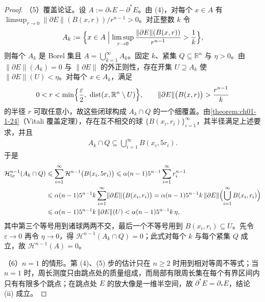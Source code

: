 \documentclass[../../main.tex]{subfiles}%
\begin{document}
\begin{proof}
（5）覆盖论证。设 $A:=\partial_*E-\partial^*E$。由 (4)，对每个 $x\in A$ 有 $\limsup_{r\to0}\lVert\partial E\rVert(B(x,r))/r^{n-1}>0$。对正整数 $k$ 令
\begin{align*}
A_k:=\Bigl\{x\in A\Bigm|\limsup_{r\to0}\frac{\lVert\partial E\rVert(B(x,r))}{r^{n-1}}>\frac1k\Bigr\},
\end{align*}
则每个 $A_k$ 是 Borel 集且 $A=\bigcup_{k=1}^{\infty}A_k$。固定 $k$、紧集 $Q\subseteq\mathbb{R}^n$ 与 $\eta>0$。由 $\lVert\partial E\rVert(A_k)=0$ 与 $\lVert\partial E\rVert$ 的外正则性，存在开集 $U\supseteq A_k$ 使 $\lVert\partial E\rVert(U)<\eta$。对每个 $x\in A_k$，满足
\begin{align*}
0<r<\min\Bigl\{\frac{\varepsilon}{2},\ \operatorname{dist}(x,\mathbb{R}^n\setminus U)\Bigr\},\qquad \lVert\partial E\rVert\bigl(B(x,r)\bigr)>\frac{r^{n-1}}{k}
\end{align*}
的半径 $r$ 可取任意小，故这些闭球构成 $A_k\cap Q$ 的一个细覆盖。由\cref{theorem:ch01-1-24}（Vitali 覆盖定理），存在互不相交的球 $\{B(x_i,r_i)\}_{i=1}^{\infty}$，其半径满足上述要求，并且%
\begin{align*}
A_k\cap Q\subseteq\bigcup_{i=1}^{\infty}B(x_i,5r_i).
\end{align*}
于是
\begin{align*}
\mathcal{H}^{n-1}_{5\varepsilon}(A_k\cap Q)
&\leqslant\sum_{i=1}^{\infty}\mathcal{H}^{n-1}\bigl(B(x_i,5r_i)\bigr)
\leqslant\alpha(n-1)5^{n-1}\sum_{i=1}^{\infty}r_i^{n-1}\\
&\leqslant\alpha(n-1)5^{n-1}k\sum_{i=1}^{\infty}\lVert\partial E\rVert\bigl(B(x_i,r_i)\bigr)
=\alpha(n-1)5^{n-1}k\,\lVert\partial E\rVert\Bigl(\bigcup_{i=1}^{\infty}B(x_i,r_i)\Bigr)\\
&\leqslant\alpha(n-1)5^{n-1}k\,\lVert\partial E\rVert(U)<\alpha(n-1)5^{n-1}k\,\eta,
\end{align*}
其中第三个等号用到诸球两两不交，最后一个不等号用到 $B(x_i,r_i)\subseteq U$。先令 $\varepsilon\to0$ 再令 $\eta\to0$，得 $\mathcal{H}^{n-1}(A_k\cap Q)=0$；此式对每个 $k$ 与每个紧集 $Q$ 成立，故 $\mathcal{H}^{n-1}(A)=0$。

（6）$n=1$ 的情形。第 (4)、(5) 步的估计只在 $n\geqslant2$ 时用到相对等周不等式；当 $n=1$ 时，周长测度只由跳点处的质量组成，而局部有限周长集在每个有界区间内只有有限多个跳点；在跳点处 $E$ 的放大像是一维半空间，故 $\partial^*E=\partial_*E$，结论 (ii) 成立。
\end{proof}
\end{document}
